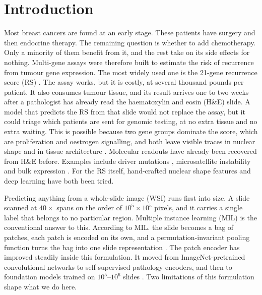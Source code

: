 \documentclass{midl} %
\begin{document}

\section{Introduction}
\label{sec:introduction}

Most breast cancers are found at an early stage. These patients have surgery and then endocrine
therapy. The remaining question is whether to add chemotherapy. Only a minority of them benefit
from it, and the rest take on its side effects for nothing. Multi-gene assays were therefore
built to estimate the risk of recurrence from tumour gene expression. The most widely used one
is the 21-gene recurrence score (RS) \citep{paik2004, sparano2018}. The assay works, but it is
costly, at several thousand pounds per patient. It also consumes tumour tissue, and its result
arrives one to two weeks after a pathologist has already read the haematoxylin and eosin (H\&E)
slide. A model that predicts the RS from that slide would not replace the assay, but it could
triage which patients are sent for genomic testing, at no extra tissue and no extra waiting.
This is possible because two gene groups dominate the score, which are proliferation and oestrogen
signalling, and both leave visible traces in nuclear shape and in tissue architecture
\citep{paik2004, elston1991}. Molecular readouts have already been recovered from H\&E before.
Examples include driver mutations \citep{coudray2018}, microsatellite instability
\citep{kather2019} and bulk expression \citep{schmauch2020}. For the RS itself, hand-crafted
nuclear shape features \citep{whitney2018} and deep learning \citep{howard2024} have both been
tried.

Predicting anything from a whole-slide image (WSI) runs first into size. A slide scanned at
$40\times$ spans on the order of $10^5 \times 10^5$ pixels, and it carries a single label that
belongs to no particular region. Multiple instance learning (MIL) is the conventional answer to
this. According to MIL. the slide becomes a bag of patches, each patch is encoded on its own, and a
permutation-invariant pooling function turns the bag into one slide representation
\citep{dietterich1997, ilse2018, campanella2019}. The patch encoder has improved steadily inside
this formulation. It moved from ImageNet-pretrained convolutional networks \citep{he2016,
lu2021} to self-supervised pathology encoders, and then to foundation models trained on
$10^5$--$10^6$ slides \citep{chen2024, filiot2023}. Two limitations of this formulation shape
what we do here.
\end{document}
